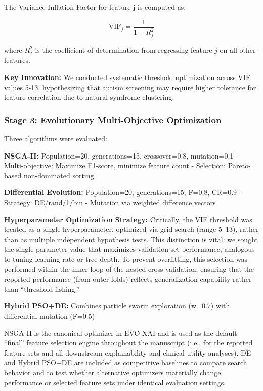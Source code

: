 \documentclass[pdflatex,sn-vancouver-num]{sn-jnl}
\begin{document}
The Variance Inflation Factor for feature j is computed as:

\[
\mathrm{VIF}_j = \frac{1}{1 - R_j^2}
\]

where \(R_j^2\) is the coefficient of determination from regressing feature \(j\) on all other features.

\textbf{Key Innovation:} We conducted systematic threshold optimization across VIF values 5-13, hypothesizing that autism screening may require higher tolerance for feature correlation due to natural syndrome clustering.

\subsubsection{Stage 3: Evolutionary Multi-Objective Optimization}\label{stage-3-evolutionary-multi-objective-optimization}

Three algorithms were evaluated:

\textbf{NSGA-II:} Population=20, generations=15, crossover=0.8, mutation=0.1 - Multi-objective: Maximize F1-score, minimize feature count - Selection: Pareto-based non-dominated sorting

\textbf{Differential Evolution:} Population=20, generations=15, F=0.8, CR=0.9 - Strategy: DE/rand/1/bin - Mutation via weighted difference vectors

\textbf{Hyperparameter Optimization Strategy:} Critically, the VIF threshold was treated as a single hyperparameter, optimized via grid search (range 5--13), rather than as multiple independent hypothesis tests. This distinction is vital: we sought the single parameter value that maximizes validation set performance, analogous to tuning learning rate or tree depth. To prevent overfitting, this selection was performed within the inner loop of the nested cross-validation, ensuring that the reported performance (from outer folds) reflects generalization capability rather than ``threshold fishing.''

\textbf{Hybrid PSO+DE:} Combines particle swarm exploration (w=0.7) with differential mutation (F=0.5)

NSGA-II is the canonical optimizer in EVO-XAI and is used as the default ``final'' feature selection engine throughout the manuscript (i.e., for the reported feature sets and all downstream explainability and clinical utility analyses). DE and Hybrid PSO+DE are included as competitive baselines to compare search behavior and to test whether alternative optimizers materially change performance or selected feature sets under identical evaluation settings.
\end{document}
